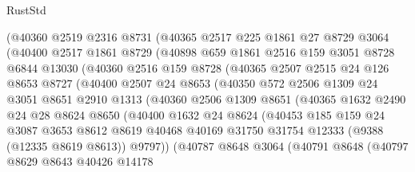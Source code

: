 \begin{lexlean}{RustStd}
\begin{coremodule}
        (@40360
          @2519
          @2316
          @8731
          (@40365
            @2517
            @225
            @1861
            @27
            @8729
            @3064
            (@40400
              @2517
              @1861
              @8729
              (@40898
                @659
                @1861
                @2516
                @159
                @3051
                @8728
                @6844
                @13030
                (@40360
                  @2516
                  @159
                  @8728
                  (@40365
                    @2507
                    @2515
                    @24
                    @126
                    @8653
                    @8727
                    (@40400
                      @2507
                      @24
                      @8653
                      (@40350
                        @572
                        @2506
                        @1309
                        @24
                        @3051
                        @8651
                        @2910
                        @1313
                        (@40360
                          @2506
                          @1309
                          @8651
                          (@40365
                            @1632
                            @2490
                            @24
                            @28
                            @8624
                            @8650
                            (@40400
                              @1632
                              @24
                              @8624
                              (@40453
                                @185
                                @159
                                @24
                                @3087
                                @3653
                                @8612
                                @8619
                                @40468
                                @40169
                                @31750
                                @31754
                                @12333
                                (@9388 (@12335 @8619 @8613))
                                @9797))
                            (@40787
                              @8648
                              @3064
                              (@40791
                                @8648
                                (@40797
                                  @8629
                                  @8643
                                  @40426
                                  @14178

\end{coremodule}
\end{lexlean}
